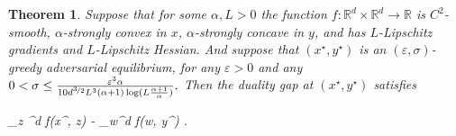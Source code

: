 \documentclass[11pt,letterpaper]{article}
\renewcommand{\epsilon}{\varepsilon}
\newtheorem{theorem}{Theorem}[section]
\def \be{\begin{equs}}
\def \ee{\end{equs}}
\begin{document}
\begin{theorem}\label{Thm_strongly_convex_concave}
Suppose that for some $\alpha, L >0$ the function $f: \mathbb{R}^d \times \mathbb{R}^d \rightarrow \mathbb{R}$ is $C^2$-smooth, $\alpha$-strongly convex in $x$, $\alpha$-strongly concave in $y$, and has $L$-Lipschitz gradients and $L$-Lipschitz Hessian. 
%
 And suppose that $(x^\star, y^\star)$ is an $(\epsilon, \sigma)$-greedy adversarial equilibrium, for any $\epsilon>0$ and any $0< \sigma \leq \frac{\epsilon^3 \alpha}{10d^{\nicefrac{3}{2}} L^3 (\alpha+1) \log(L\frac{\alpha+1}{\alpha})}.$  
 Then the duality gap at $(x^\star, y^\star)$ satisfies
%
\be
\max_{z \in {}^d} f(x^\star, z) - \min_{w\in {}^d} f(w, y^\star) \frac{\epsilon^2}{\alpha}.
\ee



\end{theorem}
\end{document}

